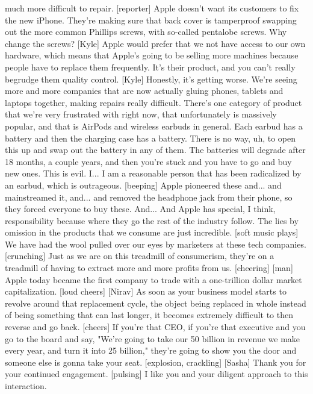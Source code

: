 \documentclass[a4paper]{article}
\begin{document}
	much more difficult to repair.
	[reporter] Apple doesn't want its customers to fix the new iPhone.
	They're making sure that back cover is tamperproof
	swapping out the more common Phillips screws,
	with so-called pentalobe screws.
	Why change the screws?
	[Kyle] Apple would prefer that we not have access to our own hardware,
	which means that Apple's going to be selling more machines
	because people have to replace them frequently.
	It's their product, and you can't really begrudge them quality control.
	[Kyle] Honestly, it's getting worse.
	We're seeing more and more companies
	that are now actually gluing phones, tablets and laptops together,
	making repairs really difficult.
	There's one category of product that we're very frustrated with right now,
	that unfortunately is massively popular,
	and that is AirPods and wireless earbuds in general.
	Each earbud has a battery and then the charging case has a battery.
	There is no way, uh, to open this up and swap out the battery in any of them.
	The batteries will degrade after 18 months, a couple years,
	and then you're stuck and you have to go and buy new ones.
	This is evil.
	I... I am a reasonable person that has been radicalized by an earbud,
	which is outrageous.
	[beeping]
	Apple pioneered these and... and mainstreamed it,
	and... and removed the headphone jack from their phone,
	so they forced everyone to buy these.
	And... And Apple has special, I think, responsibility
	because where they go the rest of the industry follow.
	The lies by omission in the products that we consume
	are just incredible.
	[soft music plays]
	We have had the wool pulled over our eyes by marketers at these tech companies.
	[crunching]
	Just as we are on this treadmill of consumerism,
	they're on a treadmill of having to extract more and more profits from us.
	[cheering]
	[man] Apple today became the first company
	to trade with a one-trillion dollar market capitalization.
	[loud cheers]
	[Nirav] As soon as your business model starts to revolve
	around that replacement cycle, the object being replaced in whole
	instead of being something that can last longer,
	it becomes extremely difficult to then reverse and go back.
	[cheers]
	If you're that CEO, if you're that executive
	and you go to the board and say, "We're going to take our
	50 billion in revenue we make every year, and turn it into 25 billion,"
	they're going to show you the door and someone else is gonna take your seat.
	[explosion, crackling]
	[Sasha] Thank you for your continued engagement.
	[pulsing]
	I like you and your diligent approach to this interaction.
\end{document}
